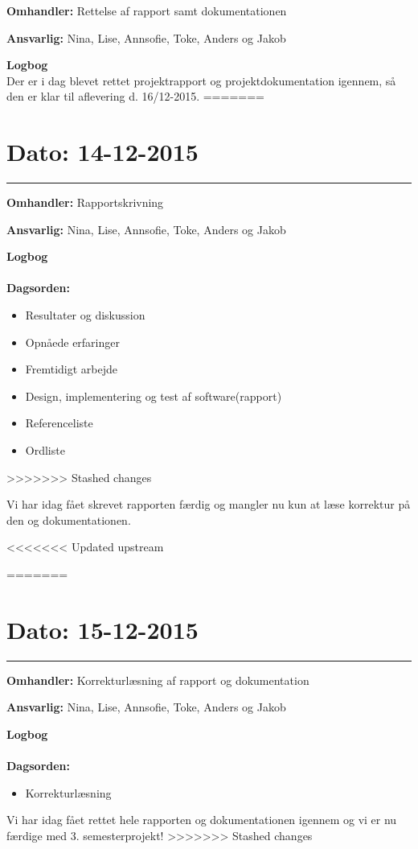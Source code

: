 \textbf{Omhandler:} Rettelse af rapport samt dokumentationen

\textbf{Ansvarlig:} Nina, Lise, Annsofie, Toke, Anders og Jakob

\textbf{Logbog}
\\
Der er i dag blevet rettet projektrapport og projektdokumentation igennem, så den er klar til aflevering d. 16/12-2015. 
=======
\section{Dato: 14-12-2015 }
\hrule

\textbf{Omhandler:} Rapportskrivning

\textbf{Ansvarlig:} Nina, Lise, Annsofie, Toke, Anders og Jakob

\textbf{Logbog}
\\
\\
\textbf{Dagsorden:}
\begin{itemize}
	\item Resultater og diskussion
	\item Opnåede erfaringer
	\item Fremtidigt arbejde
	\item Design, implementering og test af software(rapport)
	\item Referenceliste
	\item Ordliste
\end{itemize}
>>>>>>> Stashed changes
	
Vi har idag fået skrevet rapporten færdig og mangler nu kun at læse korrektur på den og dokumentationen.

	
	
	
<<<<<<< Updated upstream

=======
\section{Dato: 15-12-2015 }
\hrule

\textbf{Omhandler:} Korrekturlæsning af rapport og dokumentation

\textbf{Ansvarlig:} Nina, Lise, Annsofie, Toke, Anders og Jakob

\textbf{Logbog}
\\
\\
\textbf{Dagsorden:}
\begin{itemize}
	\item Korrekturlæsning
\end{itemize}

Vi har idag fået rettet hele rapporten og dokumentationen igennem og vi er nu færdige med 3. semesterprojekt!
>>>>>>> Stashed changes
